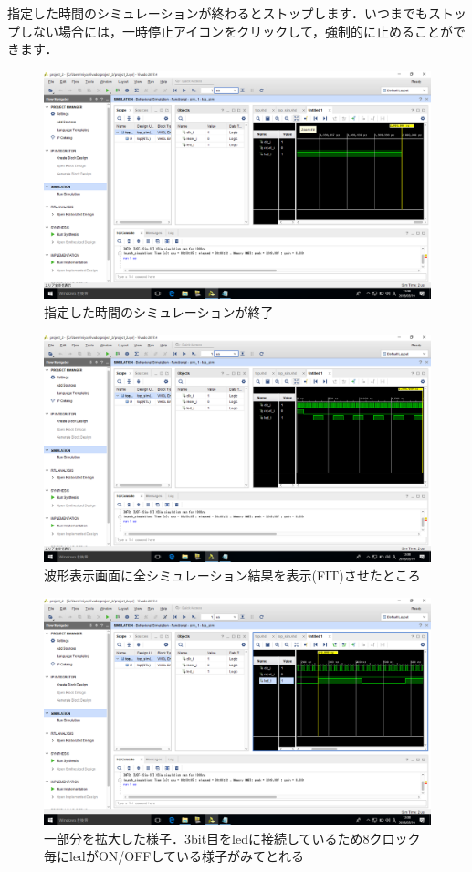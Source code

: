 \documentclass[a4paper,dvipdfmx]{jsarticle}
\begin{document}
指定した時間のシミュレーションが終わるとストップします．いつまでもストップしない場合には，一時停止アイコンをクリックして，強制的に止めることができます．

 \begin{figure}[H]
  \begin{center}
   \includegraphics[width=.8\textwidth]{chapter04_figures/VirtualBox_Windows10_19_03_2018_12_08_05.png}
  \end{center}
  \caption{指定した時間のシミュレーションが終了}
 \end{figure}

 \begin{figure}[H]
  \begin{center}
   \includegraphics[width=.8\textwidth]{chapter04_figures/VirtualBox_Windows10_19_03_2018_12_08_09.png}
  \end{center}
  \caption{波形表示画面に全シミュレーション結果を表示(FIT)させたところ}
 \end{figure}

 \begin{figure}[H]
  \begin{center}
   \includegraphics[width=.8\textwidth]{chapter04_figures/VirtualBox_Windows10_19_03_2018_12_08_29.png}
  \end{center}
  \caption{一部分を拡大した様子．3bit目をledに接続しているため8クロック毎にledがON/OFFしている様子がみてとれる}
 \end{figure}
\end{document}
